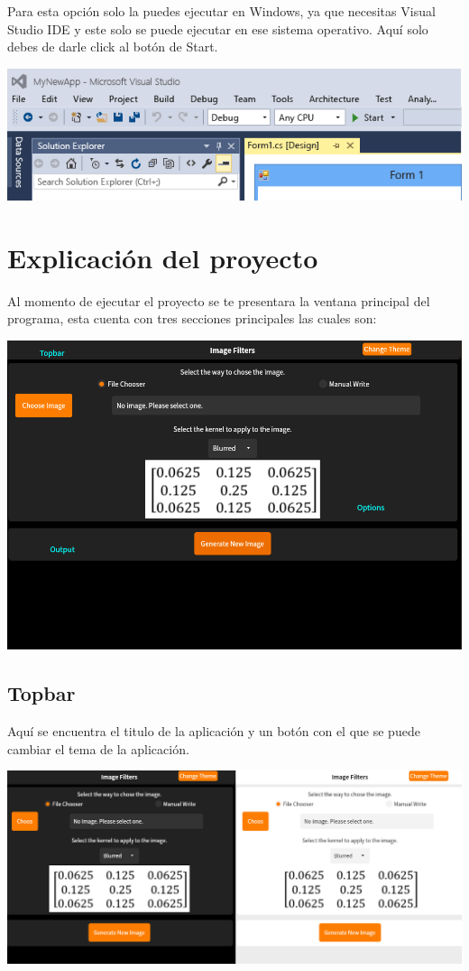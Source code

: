 \documentclass[12pt]{article}
\begin{document}
Para esta opción solo la puedes ejecutar en Windows, ya que necesitas Visual Studio IDE y este solo se puede
 ejecutar en ese sistema operativo. Aquí solo debes de darle click al botón de Start.

\includegraphics[width=\textwidth]{vs_ide}

\section{Explicación del proyecto}

Al momento de ejecutar el proyecto se te presentara la ventana principal del programa, esta cuenta con
 tres secciones principales las cuales son:

\includegraphics[width=\textwidth]{main_window}

\subsection{Topbar}

Aquí se encuentra el titulo de la aplicación y un botón con el que se puede cambiar el tema de la aplicación.

\includegraphics[width=\textwidth]{themes}
\end{document}

